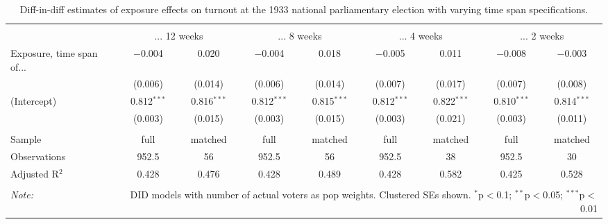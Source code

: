 
\begin{table}[!htbp] \centering 
  \caption{Diff-in-diff estimates of exposure effects on turnout at the 1933 national parliamentary election with varying time span specifications.\vspace{-.25cm}} 
  \label{tab:turnout-timespan-dd-1933} 
\scriptsize 
\begin{tabular}{@{\extracolsep{5pt}}lcccccccc} 
\\[-1.8ex]\hline 
\hline \\[-1.8ex] 
 & \multicolumn{2}{c}{... 12 weeks} & \multicolumn{2}{c}{... 8 weeks} & \multicolumn{2}{c}{... 4 weeks} & \multicolumn{2}{c}{... 2 weeks} \\ 
 \cmidrule(r){2-3}\cmidrule(r){4-5}\cmidrule(r){6-7}\cmidrule(r){8-9}Exposure, time span of... & $-$0.004 & 0.020 & $-$0.004 & 0.018 & $-$0.005 & 0.011 & $-$0.008 & $-$0.003 \\ 
  & (0.006) & (0.014) & (0.006) & (0.014) & (0.007) & (0.017) & (0.007) & (0.008) \\ 
  (Intercept) & 0.812$^{***}$ & 0.816$^{***}$ & 0.812$^{***}$ & 0.815$^{***}$ & 0.812$^{***}$ & 0.822$^{***}$ & 0.810$^{***}$ & 0.814$^{***}$ \\ 
  & (0.003) & (0.015) & (0.003) & (0.015) & (0.003) & (0.021) & (0.003) & (0.011) \\ 
 \hline \\[-1.8ex] 
Sample & full & matched & full & matched & full & matched & full & matched \\ 
Observations & 952.5 & 56 & 952.5 & 56 & 952.5 & 38 & 952.5 & 30 \\ 
Adjusted R$^{2}$ & 0.428 & 0.476 & 0.428 & 0.489 & 0.428 & 0.582 & 0.425 & 0.528 \\ 
\hline 
\hline \\[-1.8ex] 
\textit{Note:}  & \multicolumn{8}{r}{DID models with number of actual voters as pop weights. Clustered SEs shown. $^{*}$p$<$0.1; $^{**}$p$<$0.05; $^{***}$p$<$0.01} \\ 
\end{tabular} 
\end{table} 

